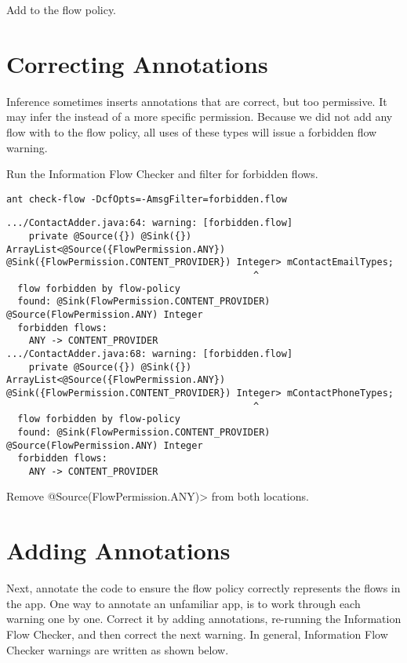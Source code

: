 Add   to the flow policy.

\section{Correcting Annotations}
Inference sometimes inserts annotations that are correct, but too permissive.  
It may infer the  instead of a more specific permission.  Because we did
not add any flow with  to the flow policy, all uses of these types will 
issue a forbidden flow warning.  

Run the Information Flow Checker and filter for forbidden flows.

\begin{Verbatim}
ant check-flow -DcfOpts=-AmsgFilter=forbidden.flow
\end{Verbatim}

\begin{Verbatim}
.../ContactAdder.java:64: warning: [forbidden.flow]
    private @Source({}) @Sink({}) ArrayList<@Source({FlowPermission.ANY}) @Sink({FlowPermission.CONTENT_PROVIDER}) Integer> mContactEmailTypes;
                                            ^
  flow forbidden by flow-policy
  found: @Sink(FlowPermission.CONTENT_PROVIDER) @Source(FlowPermission.ANY) Integer
  forbidden flows:
    ANY -> CONTENT_PROVIDER
.../ContactAdder.java:68: warning: [forbidden.flow]
    private @Source({}) @Sink({}) ArrayList<@Source({FlowPermission.ANY}) @Sink({FlowPermission.CONTENT_PROVIDER}) Integer> mContactPhoneTypes;
                                            ^
  flow forbidden by flow-policy
  found: @Sink(FlowPermission.CONTENT_PROVIDER) @Source(FlowPermission.ANY) Integer
  forbidden flows:
    ANY -> CONTENT_PROVIDER
\end{Verbatim}

Remove \<@Source({FlowPermission.ANY})> from both locations. 


\section{Adding Annotations}

Next, annotate the code to ensure the flow policy correctly represents the flows
in the app.  One way to annotate an unfamiliar app, is to work through each warning
one by one. Correct it by adding annotations, re-running the Information Flow Checker, 
and then correct the next warning.  In general, 
Information Flow Checker warnings are written as shown below.

